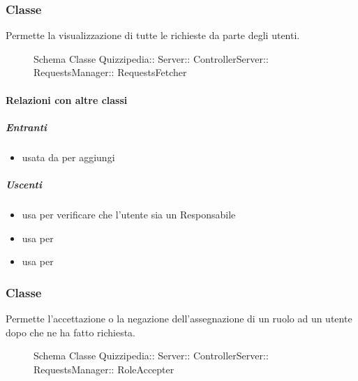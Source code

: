 \subsubsection{Classe }
Permette la visualizzazione di tutte le richieste da parte degli utenti.
\begin{figure}[H]
\centering
\noindent{}
\caption[Schema Classe RequestsFetcher]{Schema Classe Quizzipedia:: Server:: ControllerServer:: RequestsManager:: RequestsFetcher}
\end{figure}
\paragraph{Relazioni con altre classi}
\subparagraph{Entranti}
\begin{itemize}
\item usata da  per aggiungi
\end{itemize}
\subparagraph{Uscenti}
\begin{itemize}
\item usa  per verificare che l'utente sia un Responsabile
\item usa  per 
\item usa  per 
\end{itemize}
\subsubsection{Classe }
Permette l'accettazione o la negazione dell'assegnazione di un ruolo ad un utente dopo che ne ha fatto richiesta.
\begin{figure}[H]
\centering
\noindent{}
\caption[Schema Classe RoleAccepter]{Schema Classe Quizzipedia:: Server:: ControllerServer:: RequestsManager:: RoleAccepter}
\end{figure}

